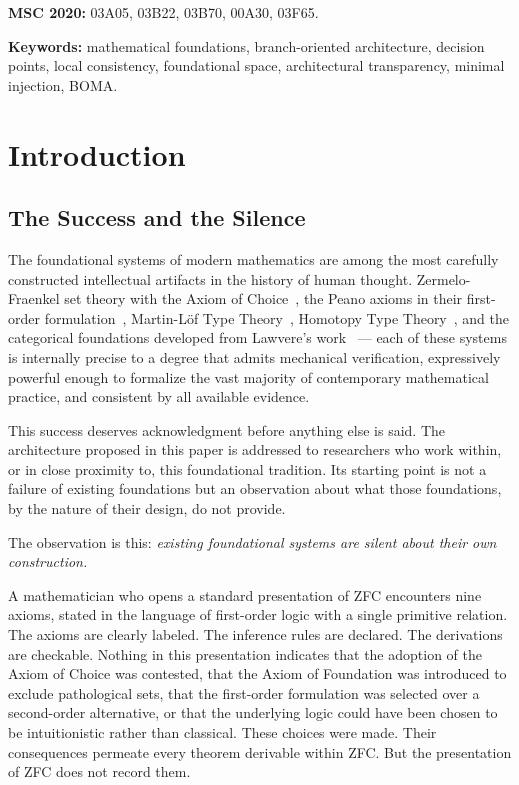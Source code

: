 \documentclass[12pt, a4paper]{article}
\theoremstyle{plain}
\theoremstyle{definition}
\theoremstyle{remark}
\newcommand{\BOMA}{\textsf{BOMA}}
\begin{document}
\medskip
\noindent\textbf{MSC 2020:}
03A05, 03B22, 03B70, 00A30, 03F65.

\medskip
\noindent\textbf{Keywords:}
mathematical foundations,
branch-oriented architecture,
decision points,
local consistency,
foundational space,
architectural transparency,
minimal injection,
\BOMA{}.

\tableofcontents
\newpage

\section{Introduction}
\label{sec:introduction}

\subsection{The Success and the Silence}
\label{subsec:success}

The foundational systems of modern mathematics are among the
most carefully constructed intellectual artifacts in the history
of human thought. Zermelo-Fraenkel set theory with the Axiom of
Choice~\cite{Jech2003,Zermelo1908}, the Peano axioms in their
first-order formulation~\cite{Peano1889}, Martin-L\"{o}f Type
Theory~\cite{MartinLof1975,MartinLof1984}, Homotopy Type
Theory~\cite{HoTTBook2013,Voevodsky2010}, and the categorical foundations
developed from Lawvere's work~\cite{Lawvere1964,MacLane1971} ---
each of these systems is internally precise to a degree that
admits mechanical verification, expressively powerful enough to
formalize the vast majority of contemporary mathematical practice,
and consistent by all available evidence.

This success deserves acknowledgment before anything else is said.
The architecture proposed in this paper is addressed to
researchers who work within, or in close proximity to, this
foundational tradition. Its starting point is not a failure of
existing foundations but an observation about what those
foundations, by the nature of their design, do not provide.

The observation is this: \emph{existing foundational systems are
silent about their own construction.}

A mathematician who opens a standard presentation of ZFC
encounters nine axioms, stated in the language of first-order
logic with a single primitive relation. The axioms are clearly
labeled. The inference rules are declared. The derivations are
checkable. Nothing in this presentation indicates that the
adoption of the Axiom of Choice was contested, that the Axiom of
Foundation was introduced to exclude pathological sets, that the
first-order formulation was selected over a second-order
alternative, or that the underlying logic could have been chosen
to be intuitionistic rather than classical. These choices were
made. Their consequences permeate every theorem derivable within
ZFC. But the presentation of ZFC does not record them.
\end{document}

